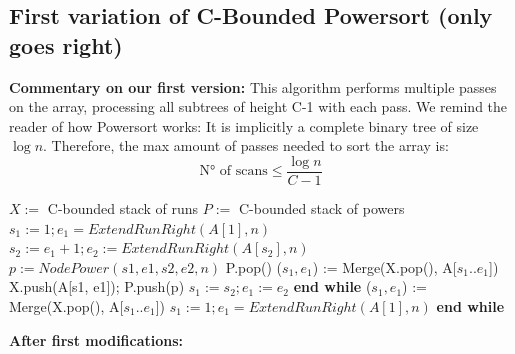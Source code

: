\documentclass{article}
\begin{document}
\subsection{\textbf{\textbf{First variation of C-Bounded Powersort (only goes right)}}}
\textbf{Commentary on our first version:} 
This algorithm performs multiple passes on the array, processing all subtrees
of height C-1 with each pass. We remind the reader of how Powersort works:
It is implicitly a complete binary tree of size $\log{n}$. Therefore, the max amount of passes
needed to sort the array is:
\begin{equation}
    \text{N° of scans} \leq {\frac{\log{n}}{{C-1}}}
\end{equation}
\begin{algorithm}
\caption{C-Bounded-Powersort 1(A[1...n], C):}\label{alg:powermy1}
\begin{algorithmic}[1]
\State $X :=$ C-bounded stack of runs 
\State $P :=$ C-bounded stack of powers 
\State $s_1 := 1; e_1 = ExtendRunRight(A[1], n)$
 
     
        \State $s_2 := e_1 + 1; e_2 := ExtendRunRight(A[s_2], n)$
        \State $p := NodePower(s1, e1, s2, e2, n)$ 
         
            \State P.pop()
            \State ($s_1, e_1$) := Merge(X.pop(), A[$s_1..e_1$])
        \EndWhile \State X.push(A[s1, e1]); P.push(p)
        \State $s_1 := s_2; e_1 := e_2$
    \EndWhile 
    \State \textbf{end while}
        \State ($s_1, e_1$) := Merge(X.pop(), A[$s_1..e_1$]) 
    \EndWhile 
    \State {}
    \State $s_1 := 1; e_1 = ExtendRunRight(A[1], n)$ 
\EndWhile 
\State \textbf{end while}
\end{algorithmic}
\end{algorithm}
\newpage
\noindent\textbf{After first modifications:}
\end{document}
